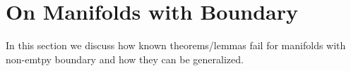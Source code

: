 \section{On Manifolds with Boundary}
    In this section we discuss how known theorems/lemmas fail for manifolds with non-emtpy boundary and how they can be generalized.
    
    
    
    

